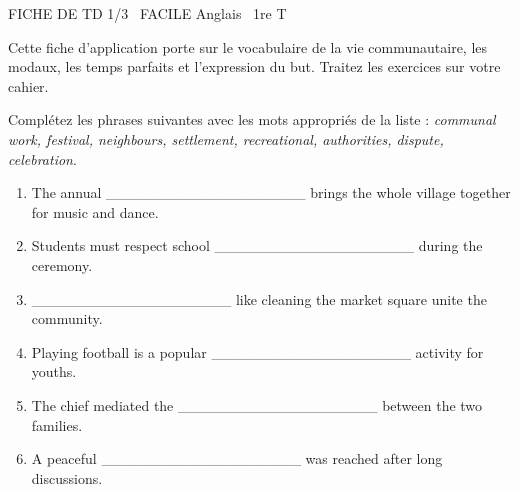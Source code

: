 \documentclass[11pt]{article}
\begin{document}
\begin{tcolorbox}[enhanced,colback=popink,colframe=popink,arc=10pt,boxrule=0pt,left=12pt,right=12pt,top=9pt,bottom=9pt]
{\color{white}\popxbold\small FICHE DE TD 1/3 \textbullet\ FACILE \hfill Anglais \textbullet\ 1re T\par}
\end{tcolorbox}
\vspace{4pt}
Cette fiche d'application porte sur le vocabulaire de la vie communautaire, les modaux, les temps parfaits et l'expression du but. Traitez les exercices sur votre cahier.

\begin{exercice}
Complétez les phrases suivantes avec les mots appropriés de la liste : \textit{communal work, festival, neighbours, settlement, recreational, authorities, dispute, celebration}.
\begin{enumerate}
    \item The annual \_\_\_\_\_\_\_\_\_\_\_\_\_\_\_\_\_\_\_ brings the whole village together for music and dance.
    \item Students must respect school \_\_\_\_\_\_\_\_\_\_\_\_\_\_\_\_\_\_\_ during the ceremony.
    \item \_\_\_\_\_\_\_\_\_\_\_\_\_\_\_\_\_\_\_ like cleaning the market square unite the community.
    \item Playing football is a popular \_\_\_\_\_\_\_\_\_\_\_\_\_\_\_\_\_\_\_ activity for youths.
    \item The chief mediated the \_\_\_\_\_\_\_\_\_\_\_\_\_\_\_\_\_\_\_ between the two families.
    \item A peaceful \_\_\_\_\_\_\_\_\_\_\_\_\_\_\_\_\_\_\_ was reached after long discussions.
\end{enumerate}
\end{exercice}
\end{document}
